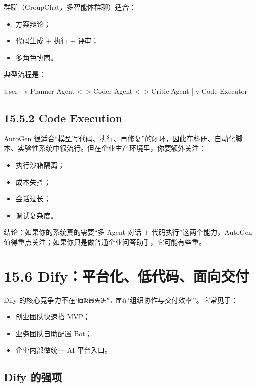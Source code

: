 群聊（GroupChat，多智能体群聊）适合：


\begin{itemize}[leftmargin=2em]
\item 方案辩论；
\item 代码生成 + 执行 + 评审；
\item 多角色协商。
\end{itemize}

典型流程是：


\begin{codeblock}
User
  |
  v
Planner Agent <--> Coder Agent <--> Critic Agent
                      |
                      v
                Code Executor
\end{codeblock}

\subsection{15.5.2 Code Execution}

AutoGen 很适合``模型写代码、执行、再修复''的闭环，因此在科研、自动化脚本、实验性系统中很流行。但在企业生产环境里，你要额外关注：


\begin{itemize}[leftmargin=2em]
\item 执行沙箱隔离；
\item 成本失控；
\item 会话过长；
\item 调试复杂度。
\end{itemize}

结论：如果你的系统真的需要``多 Agent 对话 + 代码执行''这两个能力，AutoGen 值得重点关注；如果你只是做普通企业问答助手，它可能有些重。


\section{15.6 Dify：平台化、低代码、面向交付}

Dify 的核心竞争力不在`\texttt{抽象最先进''，而在}`组织协作与交付效率''。它常见于：


\begin{itemize}[leftmargin=2em]
\item 创业团队快速搭 MVP；
\item 业务团队自助配置 Bot；
\item 企业内部做统一 AI 平台入口。
\end{itemize}

\subsection{Dify 的强项}


